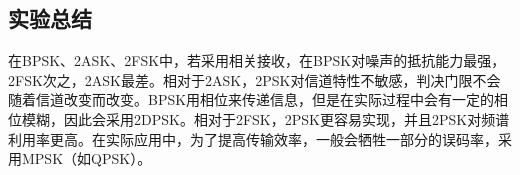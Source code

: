 \documentclass[a4paper]{article}
\begin{document}
\subsection{实验总结}

在BPSK、2ASK、2FSK中，若采用相关接收，在BPSK对噪声的抵抗能力最强，2FSK次之，2ASK最差。相对于2ASK，2PSK对信道特性不敏感，判决门限不会随着信道改变而改变。BPSK用相位来传递信息，但是在实际过程中会有一定的相位模糊，因此会采用2DPSK。相对于2FSK，2PSK更容易实现，并且2PSK对频谱利用率更高。在实际应用中，为了提高传输效率，一般会牺牲一部分的误码率，采用MPSK（如QPSK）。
\end{document}
